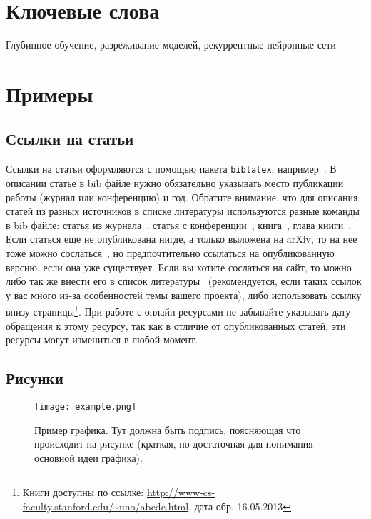 
\section*{Ключевые слова}
Глубинное обучение, разреживание моделей, рекуррентные нейронные сети
\pagebreak

\section{Примеры} 
\subsection{Ссылки на статьи}

Ссылки на статьи оформляются с помощью пакета \texttt{biblatex}, например~\cite{chirkova18}. В описании статье в bib файле нужно обязательно указывать место публикации работы (журнал или конференцию) и год. Обратите внимание, что для описания статей из разных источников в списке литературы используются разные команды в bib файле: статья из журнала~\cite{ctan}, статья с конференции~\cite{chirkova18}, книга~\cite{knuth-acp}, глава книги~\cite{knuth-fa}. Если статься еще не опубликована нигде, а только выложена на arXiv, то на нее тоже можно сослаться~\cite{chirkova18_arxiv}, но предпочтительно ссылаться на опубликованную версию, если она уже существует. Если вы хотите сослаться на сайт, то можно либо так же внести его в список литературы~\cite{knuthwebsite} (рекомендуется, если таких ссылок у вас много из-за особенностей темы вашего проекта), либо использовать ссылку внизу страницы\footnote{Книги доступны по ссылке: \url{http://www-cs-faculty.stanford.edu/~uno/abcde.html}, дата обр. 16.05.2013}. При работе с онлайн ресурсами не забывайте указывать дату обращения к этому ресурсу, так как в отличие от опубликованных статей, эти ресурсы могут измениться в любой момент.

\subsection{Рисунки}

\begin{figure}[ht]
	\centering
	\texttt{[image: example.png]}
	\caption{Пример графика. Тут должна быть подпись, поясняющая что происходит на рисунке (краткая, но достаточная для понимания основной идеи графика).}
	\label{fig:by_epochs}
\end{figure}


